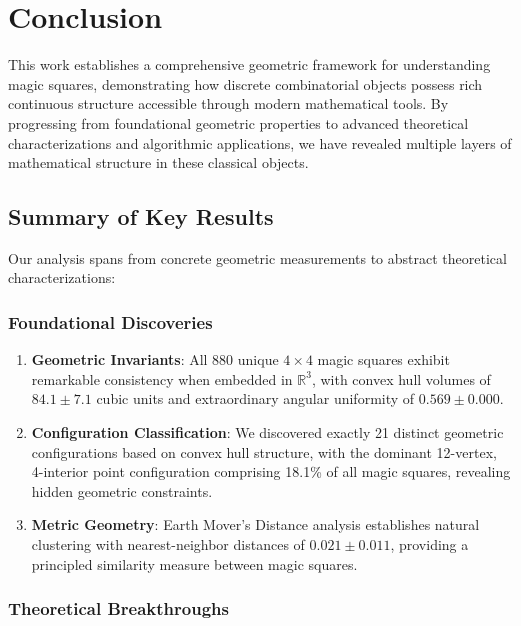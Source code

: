 \section{Conclusion}\label{sec:conclusion}

This work establishes a comprehensive geometric framework for understanding magic squares, demonstrating how discrete combinatorial objects possess rich continuous structure accessible through modern mathematical tools. By progressing from foundational geometric properties to advanced theoretical characterizations and algorithmic applications, we have revealed multiple layers of mathematical structure in these classical objects.

\subsection{Summary of Key Results}

Our analysis spans from concrete geometric measurements to abstract theoretical characterizations:

\subsubsection{Foundational Discoveries}

\begin{enumerate}
    \item \textbf{Geometric Invariants}: All 880 unique $4 \times 4$ magic squares exhibit remarkable consistency when embedded in $\mathbb{R}^3$, with convex hull volumes of $84.1 \pm 7.1$ cubic units and extraordinary angular uniformity of $0.569 \pm 0.000$.
    
    \item \textbf{Configuration Classification}: We discovered exactly 21 distinct geometric configurations based on convex hull structure, with the dominant 12-vertex, 4-interior point configuration comprising 18.1\% of all magic squares, revealing hidden geometric constraints.
    
    \item \textbf{Metric Geometry}: Earth Mover's Distance analysis establishes natural clustering with nearest-neighbor distances of $0.021 \pm 0.011$, providing a principled similarity measure between magic squares.
\end{enumerate}

\subsubsection{Theoretical Breakthroughs}

